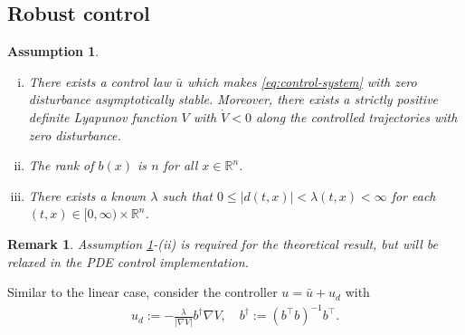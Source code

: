 \documentclass[letterpaper, 10 pt, conference]{ieeeconf}  %
\newtheorem{assumption}{Assumption}
\newtheorem{remark}{Remark}
\newcommand{\tp}{^\top}
\newcommand{\inv}{^{-1}}
\newcommand{\R}{\mathbb{R}}
\newcommand{\ip}[2]{\langle #1, #2 \rangle}
\newcommand{\grad}{\nabla}
\begin{document}
\subsection{Robust control}
\begin{assumption}
\begin{enumerate}[(i)]
    \item There exists a control law $\bar{u}$ which makes \eqref{eq:control-system} with zero disturbance asymptotically stable. Moreover, there exists a strictly positive definite Lyapunov function $V$ with $\dot{V} < 0$ along the controlled trajectories with zero disturbance. 
    \item The rank of $b(x)$ is $n$ for all $x \in \R^n$. 
    \item There exists a known $\lambda$ such that $0 \le |d(t,x)| < \lambda(t,x) < \infty$ for each $(t,x) \in [0,\infty) \times \R^n$.
\end{enumerate}
\label{assn:b}
\end{assumption}
\begin{remark}
    Assumption \ref{assn:b}-(ii) is required for the theoretical result, but will be relaxed in the PDE control implementation. 
\end{remark}


Similar to the linear case, consider the controller $u = \bar{u} + u_d$ with 
\begin{align*}
    u_d := - \frac{\lambda}{| \grad V |} b^{\dagger} \grad V, \quad b^{\dagger} := (b\tp b)\inv b\tp.
\end{align*}
\end{document}
